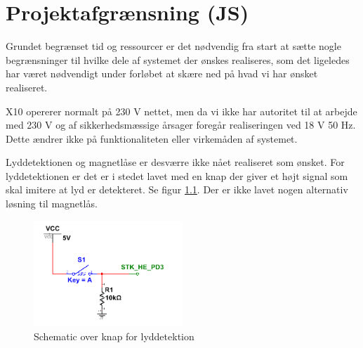 \chapter{Projektafgrænsning (JS)}

Grundet begrænset tid og ressourcer er det nødvendig fra start at sætte nogle begrænsninger til hvilke dele af systemet der ønskes realiseres, som det ligeledes har været nødvendigt under forløbet at skære ned på hvad vi har ønsket realiseret. 

X10 opererer normalt på 230 V nettet, men da vi ikke har autoritet til at arbejde med 230 V og af sikkerhedsmæssige årsager foregår realiseringen ved 18 V 50 Hz. Dette ændrer ikke på funktionaliteten eller virkemåden af systemet. 

Lyddetektionen og magnetlåse er desværre ikke nået realiseret som ønsket.
For lyddetektionen er det er i stedet lavet med en knap der giver et højt signal som skal imitere at lyd er detekteret. Se figur \ref{fig:BABY_ALARM}. 
Der er ikke lavet nogen alternativ løsning til magnetlås.

\begin{figure}[htbp]
  \centering
    \includegraphics[width=0.5\textwidth]{billeder/BABY_SWITCH}
    \caption{Schematic over knap for lyddetektion}
    \label{fig:BABY_ALARM}
\end{figure}


